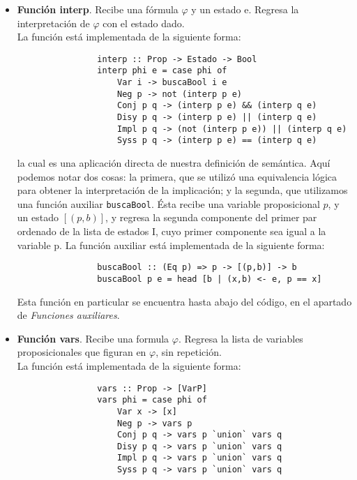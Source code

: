 \documentclass[letterpaper,11pt]{article}
\begin{document}
\begin{itemize}
        \begin{itemize}
            \item \textbf{Función interp}. Recibe una fórmula $\varphi$ y un 
            estado e. Regresa la interpretación de $\varphi$ con el estado 
            dado.\\
            La función está implementada de la siguiente forma:
            \begin{lstlisting}
                interp :: Prop -> Estado -> Bool
                interp phi e = case phi of 
                    Var i -> buscaBool i e
                    Neg p -> not (interp p e)
                    Conj p q -> (interp p e) && (interp q e)
                    Disy p q -> (interp p e) || (interp q e)
                    Impl p q -> (not (interp p e)) || (interp q e)
                    Syss p q -> (interp p e) == (interp q e)
            \end{lstlisting}
            la cual es una aplicación directa de nuestra definición de 
            semántica. Aquí podemos notar dos cosas: la primera, que se 
            utilizó una equivalencia lógica para obtener la interpretación 
            de la implicación; y la segunda, que utilizamos una función 
            auxiliar \texttt{buscaBool}. Ésta recibe una variable proposicional
            $p$, y un estado $[(p,b)]$, y regresa la segunda componente del 
            primer par ordenado de la lista de estados I, cuyo primer 
            componente sea igual a la variable p.
            La función auxiliar está implementada de la siguiente forma:
            \begin{lstlisting}
                buscaBool :: (Eq p) => p -> [(p,b)] -> b 
                buscaBool p e = head [b | (x,b) <- e, p == x]
            \end{lstlisting}
            
            Esta función en particular se encuentra hasta abajo del código, en
            el apartado de \textit{Funciones auxiliares}.

            \item \textbf{Función vars}. Recibe una formula $\varphi$. Regresa
            la lista de variables proposicionales que figuran en $\varphi$, 
            sin repetición. \\
            La función está implementada de la siguiente forma:
            \begin{lstlisting}
                vars :: Prop -> [VarP]
                vars phi = case phi of
                    Var x -> [x]
                    Neg p -> vars p
                    Conj p q -> vars p `union` vars q
                    Disy p q -> vars p `union` vars q
                    Impl p q -> vars p `union` vars q
                    Syss p q -> vars p `union` vars q
            \end{lstlisting}


\end{itemize}
\end{itemize}
\end{document}
